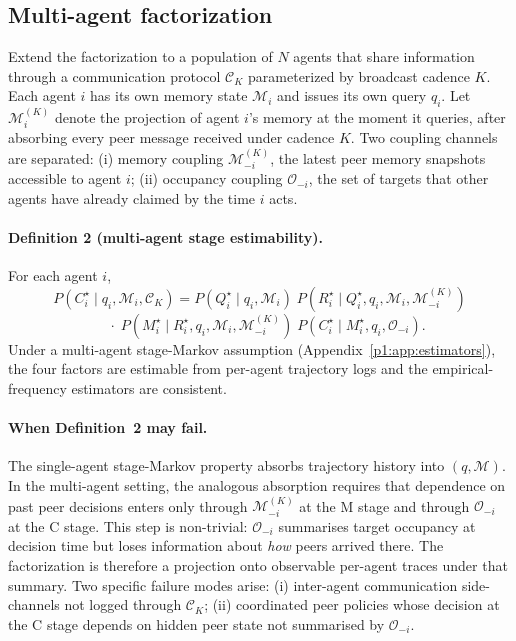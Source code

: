 \documentclass{article}
\begin{document}
\subsection{Multi-agent factorization}
\label{p1:sec:multi-theory}

Extend the factorization to a population of $N$ agents that share
information through a communication protocol $\mathcal{C}_K$
parameterized by broadcast cadence $K$. Each agent $i$ has its own
memory state $\mathcal{M}_i$ and issues its own query $q_i$. Let
$\mathcal{M}_i^{(K)}$ denote the projection of agent $i$'s memory at
the moment it queries, after absorbing every peer message received
under cadence $K$. Two coupling channels are separated: (i) memory
coupling $\mathcal{M}_{-i}^{(K)}$, the latest peer memory snapshots
accessible to agent $i$; (ii) occupancy coupling $\mathcal{O}_{-i}$,
the set of targets that other agents have already claimed by the time
$i$ acts.

\paragraph{Definition 2 (multi-agent stage estimability).}
For each agent $i$,
\[
P(C^\star_i \mid q_i, \mathcal{M}_i, \mathcal{C}_K)
=
P(Q^\star_i \mid q_i, \mathcal{M}_i)\;
P(R^\star_i \mid Q^\star_i, q_i, \mathcal{M}_i, \mathcal{M}_{-i}^{(K)})
\]
\[
\quad \cdot\;
P(M^\star_i \mid R^\star_i, q_i, \mathcal{M}_i, \mathcal{M}_{-i}^{(K)})\;
P(C^\star_i \mid M^\star_i, q_i, \mathcal{O}_{-i}).
\]
Under a multi-agent stage-Markov assumption
(Appendix~\ref{p1:app:estimators}), the four factors are estimable from
per-agent trajectory logs and the empirical-frequency estimators are
consistent.

\paragraph{When Definition~2 may fail.}
The single-agent stage-Markov property absorbs trajectory history into
$(q, \mathcal{M})$. In the multi-agent setting, the analogous
absorption requires that dependence on past peer decisions enters only
through $\mathcal{M}_{-i}^{(K)}$ at the M stage and through
$\mathcal{O}_{-i}$ at the C stage. This step is non-trivial:
$\mathcal{O}_{-i}$ summarises target occupancy at decision time but
loses information about \emph{how} peers arrived there. The
factorization is therefore a projection onto observable per-agent
traces under that summary. Two specific failure modes arise: (i)
inter-agent communication side-channels not logged through
$\mathcal{C}_K$; (ii) coordinated peer policies whose decision at the
C stage depends on hidden peer state not summarised by
$\mathcal{O}_{-i}$.
\end{document}
